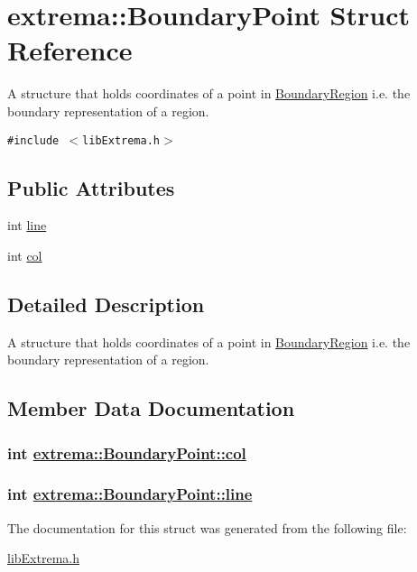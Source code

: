 \hypertarget{structextrema_1_1BoundaryPoint}{
\section{extrema::Boundary\-Point Struct Reference}
\label{structextrema_1_1BoundaryPoint}
}
A structure that holds coordinates of a point in \hyperlink{structextrema_1_1BoundaryRegion}{Boundary\-Region} i.e. the boundary representation of a region.  


{\tt \#include $<$lib\-Extrema.h$>$}

\subsection*{Public Attributes}
\begin{CompactItemize}
\item 
int \hyperlink{structextrema_1_1BoundaryPoint_8a85580c122478b3ae88ded0f489c06f}{line}
\item 
int \hyperlink{structextrema_1_1BoundaryPoint_79813dc64cf9e119aaa7619acd939d69}{col}
\end{CompactItemize}


\subsection{Detailed Description}
A structure that holds coordinates of a point in \hyperlink{structextrema_1_1BoundaryRegion}{Boundary\-Region} i.e. the boundary representation of a region. 



\subsection{Member Data Documentation}
\hypertarget{structextrema_1_1BoundaryPoint_79813dc64cf9e119aaa7619acd939d69}{
\subsubsection[col]{\setlength{\rightskip}{0pt plus 5cm}int \hyperlink{structextrema_1_1BoundaryPoint_79813dc64cf9e119aaa7619acd939d69}{extrema::Boundary\-Point::col}}}
\label{structextrema_1_1BoundaryPoint_79813dc64cf9e119aaa7619acd939d69}


\hypertarget{structextrema_1_1BoundaryPoint_8a85580c122478b3ae88ded0f489c06f}{
\subsubsection[line]{\setlength{\rightskip}{0pt plus 5cm}int \hyperlink{structextrema_1_1BoundaryPoint_8a85580c122478b3ae88ded0f489c06f}{extrema::Boundary\-Point::line}}}
\label{structextrema_1_1BoundaryPoint_8a85580c122478b3ae88ded0f489c06f}




The documentation for this struct was generated from the following file:\begin{CompactItemize}
\item 
\hyperlink{libExtrema_8h}{lib\-Extrema.h}\end{CompactItemize}
